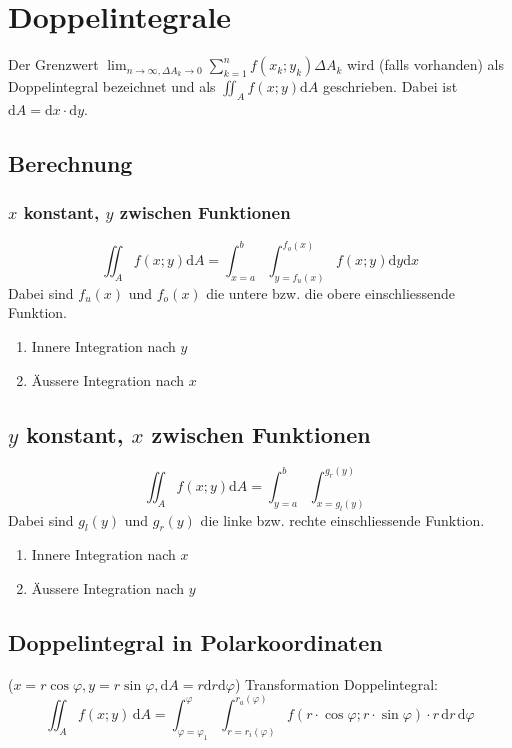 \section{Doppelintegrale}
Der Grenzwert $\lim_{n \rightarrow \infty, \Delta A_k \rightarrow 0} \sum_{k=1}^n f(x_k; y_k) \Delta A_k$ wird (falls vorhanden) als Doppelintegral bezeichnet und als $\iint_A f(x;y) \mathrm dA$ geschrieben. Dabei ist $\mathrm dA = \mathrm dx \cdot \mathrm dy$.

\subsection{Berechnung}
\subsubsection{$x$ konstant, $y$ zwischen Funktionen}
\begin{equation*}
	\iint_A f(x; y) \mathrm dA = \int_{x=a}^b \int_{y = f_u(x)}^{f_o(x)} f(x; y) \mathrm dy \mathrm dx
\end{equation*}
Dabei sind $f_u(x)$ und $f_o(x)$ die untere bzw. die obere einschliessende Funktion.
\begin{enumerate}\itemsep0em
	\item Innere Integration nach $y$
	\item Äussere Integration nach $x$
\end{enumerate}


\subsection{$y$ konstant, $x$ zwischen Funktionen}
\begin{equation*}
	\iint_A f(x; y) \mathrm dA = \int_{y=a}^b \int_{x = g_l(y)}^{g_r(y)}
\end{equation*}
Dabei sind $g_l(y)$ und $g_r(y)$ die linke bzw. rechte einschliessende Funktion.
\begin{enumerate}\itemsep0em
	\item Innere Integration nach $x$
	\item Äussere Integration nach $y$
\end{enumerate}

\subsection{Doppelintegral in Polarkoordinaten}
($x = r \cos \varphi, y = r \sin \varphi, \mathrm dA = r\mathrm dr \mathrm d\varphi$)
Transformation Doppelintegral:
\begin{equation*}
	\iint_A f(x; y)\, \mathrm dA = \int_{\varphi = \varphi_1}^\varphi \int_{r=r_i(\varphi)}^{r_a(\varphi)} f(r \cdot \cos \varphi; r \cdot \sin \varphi) \cdot r\,\mathrm dr \,\mathrm d\varphi
\end{equation*}


